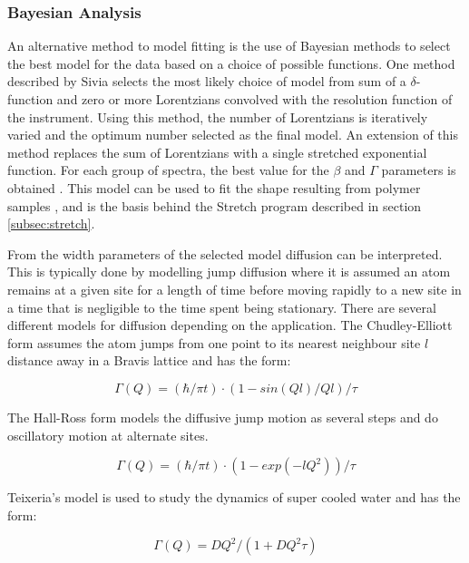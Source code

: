 \documentclass[paper=a4, fontsize=11pt]{scrartcl}	%
\numberwithin{equation}{section}															%
\numberwithin{figure}{section}																%
\numberwithin{table}{section}																%
\begin{document}
\subsubsection{Bayesian Analysis}
An alternative method to model fitting is the use of Bayesian methods to select the best model for the data based on a choice of possible functions. One method described by Sivia \cite{dssivia1992} selects the most likely choice of model from sum of a $\delta$-function and zero or more Lorentzians convolved with the resolution function of the instrument. Using this method, the number of Lorentzians is iteratively varied and the optimum number selected as the final model. An extension of this method replaces the sum of Lorentzians with a single stretched exponential function. For each group of spectra, the best value for the $\beta$ and $\Gamma$ parameters is obtained \cite{wshowells2010}. This model can be used to fit the shape resulting from polymer samples \cite{wshowells1996}\cite{higgins1977observation}\cite{higgins1977q}, and is the basis behind the Stretch program described in section \ref{subsec:stretch}.

From the width parameters of the selected model diffusion can be interpreted. This is typically done by modelling jump diffusion where it is assumed an atom remains at a given site for a length of time before moving rapidly to a new site in a time that is negligible to the time spent being stationary. There are several different models for diffusion depending on the application. The Chudley-Elliott form assumes the atom jumps from one point to its nearest neighbour site $l$ distance away in a Bravis lattice \cite{chudley1961neutron} and has the form:

\begin{equation}
\Gamma(Q) = (\hbar/\pi t) \cdot (1 - sin(Ql)/Ql)/\tau
\end{equation}

The Hall-Ross \cite{hall1981incoherent} form models the diffusive jump motion as several steps and do oscillatory motion at alternate sites.

\begin{equation}
\Gamma(Q) = (\hbar/\pi t) \cdot (1-exp(-lQ^2))/\tau
\end{equation}

Teixeria's model \cite{teixeira1985experimental} is used to study the dynamics of super cooled water and has the form:

\begin{equation}
\Gamma(Q) = DQ^2/(1 + DQ^2\tau)
\end{equation}
\end{document}
